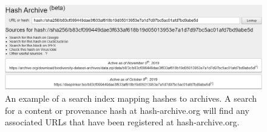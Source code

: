 \begin{figure}[t] %


\includegraphics[width=\textwidth]{figures-fig5_grayscale.png}

\caption{An example of a search index mapping hashes to archives. A search for a content or provenance hash at hash-archive.org will find any associated URLs that have been registered at hash-archive.org.}

\label{fig5} %

\end{figure}
